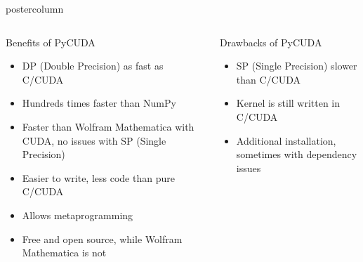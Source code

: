 \documentclass[final,hyperref={pdfpagelabels=false}]{beamer}
\newlength{\columnheight}
\begin{document}
\begin{frame}
\begin{columns}
\begin{column}{.49\textwidth}
\begin{beamercolorbox}[center,wd=\textwidth]{postercolumn}
\begin{minipage}[T]{.95\textwidth}
{                \begin{columns}
                  \begin{column}{.45\textwidth}
                    \begin{block}{Benefits of PyCUDA}
             	      \begin{itemize}
                       	\item DP (Double Precision) as fast as C/CUDA
                       	\item Hundreds times faster than NumPy
                       	\item Faster than Wolfram Mathematica with CUDA, no issues with SP (Single Precision)
                       	\item Easier to write, less code than pure C/CUDA
                       	\item Allows metaprogramming
                       	\item Free and open source, while Wolfram Mathematica is not
                      \end{itemize}
                    \end{block}
                  \end{column}
                  \begin{column}{.45\textwidth}
                    \begin{block}{Drawbacks of PyCUDA}
                      \begin{itemize}
                        \item SP (Single Precision) slower than C/CUDA
                        \item Kernel is still written in C/CUDA
                        \item Additional installation, sometimes with dependency issues
                      \end{itemize}
                    \end{block}
                  \end{column}
                \end{columns}
            
                \vspace{.005\columnheight}
            
}
\end{minipage}
\end{beamercolorbox}
\end{column}
\end{columns}
\end{frame}
\end{document}
